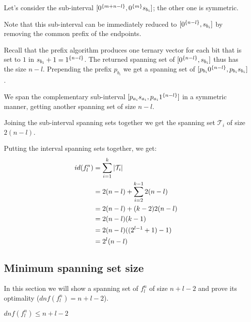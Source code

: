 Let's consider the sub-interval
$[0^{\{m+n-l\}}, 0^{\{m\}} s_{b_i}]$;
the other one is symmetric.

Note that this sub-interval can be immediately reduced
to $[0^{\{n-l\}}, s_{b_i}]$
by removing the common prefix of the endpoints.

Recall that the prefix algorithm
produces one ternary vector
for each bit that is set to $1$
in $s_{b_i} + 1 = 1^{\{n-l\}}$.
The returned spanning set of
$[0^{\{n-l\}}, s_{b_i}]$
thus has the size $n-l$.
Prepending the prefix $p_{b_i}$
we get a spanning set of
$[p_{b_i} 0^{\{n-l\}}, p_{b_i} s_{b_i}]$.

We span the complementary sub-interval
$[p_{a_i} s_{a_i}, p_{a_i} 1^{\{n-l\}}]$
in a symmetric manner,
getting another spanning set of size $n-l$.

Joining the sub-interval spanning sets together
we get the spanning set $\mathcal{T}_i$ of size $2(n-l)$.

\hfill

Putting the interval spanning sets together,
we get:
\begin{align*}
id(f_l^n) &= \sum_{i=1}^k{\lvert\mathcal{T}_i\rvert} \\
&= 2 (n-l) + \sum_{i=2}^{k-1}{2 (n-l)} \\
&= 2 (n-l) + (k-2) 2 (n-l) \\
&= 2 (n-l) (k-1) \\
&= 2 (n-l) ((2^{l-1} + 1) - 1) \\
&= 2^l (n-l)
\end{align*}

\subsection{Minimum spanning set size}

In this section we will show a spanning set
of $f^n_l$ of size $n+l-2$
and prove its optimality
($dnf(f^n_l) = n+l-2$).

\begin{lemma}
$dnf(f_l^n) \leq n+l-2$
\end{lemma}

